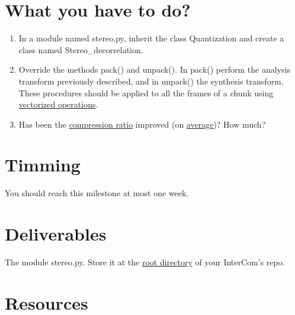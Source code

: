 \section{What you have to do?}

\begin{enumerate}
\item In a module named stereo.py, inherit the class
  Quantization and create a class named Stereo\_decorrelation.
\item Override the methods pack() and unpack(). In pack() perform the
  analysis transform previously described, and in unpack() the
  synthesis transform. These procedures should be applied to all the
  frames of a chunk using
  \href{https://www.oreilly.com/library/view/python-for-data/9781449323592/ch04.html}{vectorized
    operations}.
\item Has been the
  \href{https://en.wikipedia.org/wiki/Data_compression_ratio}{compression
    ratio} improved (on
  \href{https://en.wikipedia.org/wiki/Average}{average})? How much?
\end{enumerate}

\section{Timming}

You should reach this milestone at most one week.

\section{Deliverables}

The module stereo.py. Store it at the
\href{https://github.com/Tecnologias-multimedia/intercom}{root
  directory} of your InterCom's repo.

\section{Resources}


